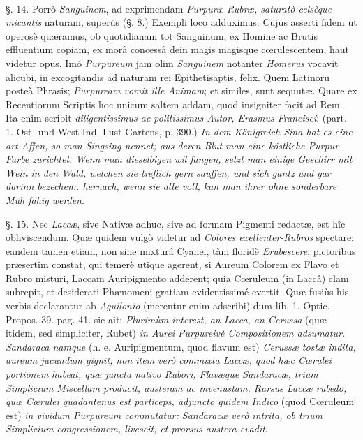 \documentclass[a4paper, 11pt, oneside, polutonikogreek, german]{article}
\begin{document}
\paragraph{}
§. 14. Porrò \emph{Sanguinem}, ad exprimendam \emph{Purpuræ Rubræ, saturatò celsèque micantis} naturam, superùs (§. 8.) Exempli loco adduximus. Cujus asserti fidem ut operosè quæramus, ob quotidianam tot Sanguinum, ex Homine ac Brutis effluentium copiam, ex morâ concessâ dein magis magisque cœrulescentem, haut videtur opus. Imó \emph{Purpureum} jam olim \emph{Sanguinem} notanter \emph{Homerus} vocavit alicubi, in excogitandis ad naturam rei Epithetisaptis, felix. Quem Latinorū posteà Phrasis; \emph{Purpuream vomit ille Animam}; et similes, sunt sequutæ. Quare ex Recentiorum Scriptis hoc unicum saltem addam, quod insigniter facit ad Rem. Ita enim seribit \emph{diligentissimus ac politissimus Autor, Erasmus Francisci}: (part. 1. Ost- und West-Ind. Lust-Gartens, p. 390.) \emph{In dem Königreich Sina hat es eine art Affen, so man Singsing nennet; aus deren Blut man eine köstliche Purpur-Farbe zurichtet. Wenn man dieselbigen wil fangen, setzt man einige Geschirr mit Wein in den Wald, welchen sie treflich gern sauffen, und sich gantz und gar darinn bezechen:. hernach, wenn sie alle voll, kan man ihrer ohne sonderbare Müh fähig werden}.

§. 15. Nec \emph{Laccæ}, sive Nativæ adhuc, sive ad formam Pigmenti redactæ, est hîc obliviscendum. Quæ quidem vulgò videtur ad \emph{Colores exellenter-Rubros} spectare: eandem tamen etiam, non sine mixturâ Cyanei, tàm floridè \emph{Erubescere}, pictoribus præsertim constat, qui temerè utique agerent, si Aureum Colorem ex Flavo et Rubro misturi, Laccam Auripigmento adderent; quia Cœruleum (in Laccâ) clam subrepit, et desiderati Phænomeni gratiam evidentissimé evertit. Quæ fusiùs his verbis declarantur ab \emph{Aguilonio} (merentur enim adscribi) dum lib. 1. Optic. Propos. 39. pag. 41. sic ait: \emph{Plurimùm interest, an Lacca, an Cerussa} (quæ itidem, sed simpliciter, Rubet) \emph{in Aurei Purpureivè Compositionem adsumatur. Sandaraca namque} (h. e. Auripigmentum, quod flavum est) \emph{Cerussæ tostæ indita, aureum jucundum gignit; non item verò commixta Laccæ, quod hæc Cœrulei portionem habeat, quæ juncta nativo Rubori, Flavæque Sandaracæ, trium Simplicium Miscellam producit, austeram ac invenustam. Rursus Laccæ rubedo, quæ Cœrulei quadantenus est particeps, adjuncto quidem Indico} (quod Cœruleum est) \emph{in vividum Purpureum commutatur: Sandaracæ verò intrita, ob trium Simplicium congressionem, livescit, et prorsus austera evadit}.
\end{document}
